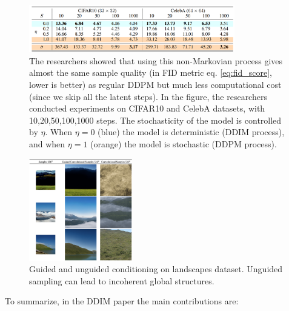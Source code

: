 \begin{figure}
    \centering
    \includegraphics[width=0.8\textwidth]{images/diffusion_models/stable_diffusion/ddim_sample_quality.png}
    \caption{The researchers showed that using this non-Markovian process gives almost the same sample quality (in FID metric eq. \ref{eq:fid_score}, lower is better) as regular DDPM but much less computational cost (since we skip all the latent steps). In the figure, the researchers conducted experiments on CIFAR10 and CelebA datasets, with 10,20,50,100,1000 steps. The stochasticity of the model is controlled by $\eta$. When $\eta = 0$ (blue) the model is deterministic (DDIM process), and when $\eta = 1$ (orange) the model is stochastic (DDPM process).}
\end{figure}

\begin{figure}
    \centering
    \includegraphics[width=0.4\textwidth]{images/diffusion_models/stable_diffusion/guided_conditioning.png}
    \caption{Guided and unguided conditioning on landscapes dataset. Unguided sampling can lead to incoherent global structures.}
\end{figure}

To summarize, in the DDIM paper \cite{ddim} the main contributions are:


